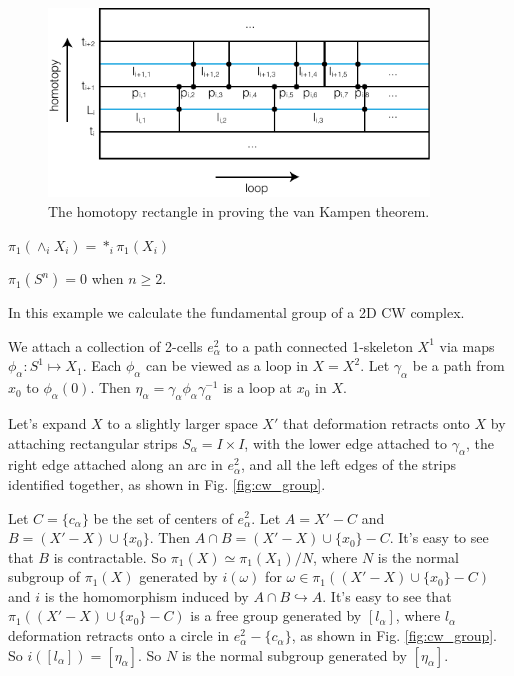 \documentclass[12pt]{book}
\begin{document}
\begin{figure}[htb!]
	\centering  
	\includegraphics[width=0.9\textwidth ]{resources/chap_fund_grp/vankampen_thm.pdf}  
	\caption{The homotopy rectangle in proving the van Kampen theorem.}
	\label{fig:vankampen_thm}
\end{figure}


\begin{lemma}
	$\pi_1(\wedge_iX_i)=*_i\pi_1(X_i)$
\end{lemma}

\begin{lemma}
	$\pi_1(S^n)=0$ when $n\geq 2$.
\end{lemma}

\begin{example}
	In this example we calculate the fundamental group of a 2D CW complex.

	We attach a collection of 2-cells $e^2_\alpha$ to a path connected 1-skeleton $X^1$ via maps $\phi_\alpha:S^1\mapsto X_1$. Each $\phi_\alpha$ can be viewed as a loop in $X=X^2$. Let $\gamma_\alpha$ be a path from $x_0$ to $\phi_\alpha(0)$. Then $\eta_\alpha=\gamma_\alpha\phi_\alpha\gamma_\alpha^{-1}$ is a loop at $x_0$ in $X$.
	
	Let's expand $X$ to a slightly larger space $X'$ that deformation retracts onto $X$ by attaching rectangular strips $S_\alpha=I\times I$, with the lower edge attached to $\gamma_\alpha$, the right edge attached along an arc in $e_\alpha^2$, and all the left edges of the strips identified together, as shown in Fig. \ref{fig:cw_group}.
	
	 Let $C=\{c_\alpha\}$ be the set of centers of $e^2_\alpha$. Let $A=X'-C$ and $B=(X'-X)\cup \{x_0\}$. Then $A\cap B=(X'-X)\cup \{x_0\} -C$. It's easy to see that $B$ is contractable. So $\pi_1(X)\simeq\pi_1(X_1)/N$, where $N$ is the normal subgroup of $\pi_1(X)$ generated by $i(\omega)$ for $\omega\in\pi_1((X'-X)\cup \{x_0\} -C)$ and $i$ is the homomorphism induced by $A\cap B\hookrightarrow A$. It's easy to see that $\pi_1((X'-X)\cup \{x_0\} -C)$ is a free group generated by $[l_\alpha]$, where $l_\alpha$ deformation retracts onto a circle in $e^2_\alpha-\{c_\alpha\}$, as shown in Fig. \ref{fig:cw_group}. So $i([l_\alpha])=[\eta_\alpha]$. So $N$ is the normal subgroup generated by $[\eta_\alpha]$.
	 
	 \label{emp:cw_fund_grp}
\end{example}
\end{document}
